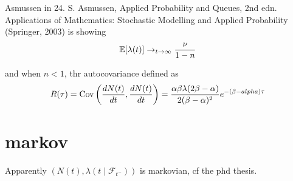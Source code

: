 \documentclass[11pt]{book}
\begin{document}
Asmussen in 24. S. Asmussen, Applied Probability and Queues, 2nd edn. Applications of Mathematics: Stochastic Modelling and
Applied Probability (Springer, 2003) is showing $$\mathbb E [ \lambda(t) ] \to_{t \to \infty } \frac{\nu}{1-n}$$

and when $n < 1$, thr autocovariance defined as $$ R( \tau ) = \mathrm{Cov} \left ( \frac{dN(t)}{dt}, \frac{dN(t)}{dt} \right )= \frac{\alpha \beta \lambda ( 2 \beta - \alpha ) }{2 ( \beta - \alpha ) ^2 }  e^{- ( \beta - alpha ) \tau }  $$



\section{markov}

Apparently $(N(t), \lambda(t \mid \mathcal F_{t^-} ))$ is markovian, cf the phd thesis. 

\cleardoublepage%
\appendix
\pagestyle{back}





\backmatter
\end{document}
